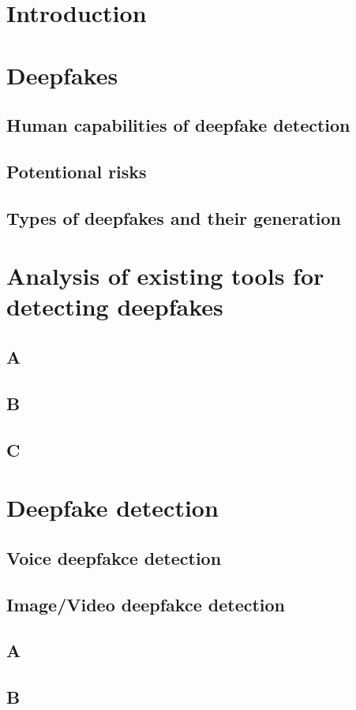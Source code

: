 \chapter{Introduction}

\chapter{Deepfakes}
\section{Human capabilities of deepfake detection}
\section{Potentional risks}
\section{Types of deepfakes and their generation}

\chapter{Analysis of existing tools for detecting deepfakes}
\section{A}
\section{B}
\section{C}

\chapter{Deepfake detection}
\section{Voice deepfakce detection}
\section{Image/Video deepfakce detection}
\section{A}
\section{B}
